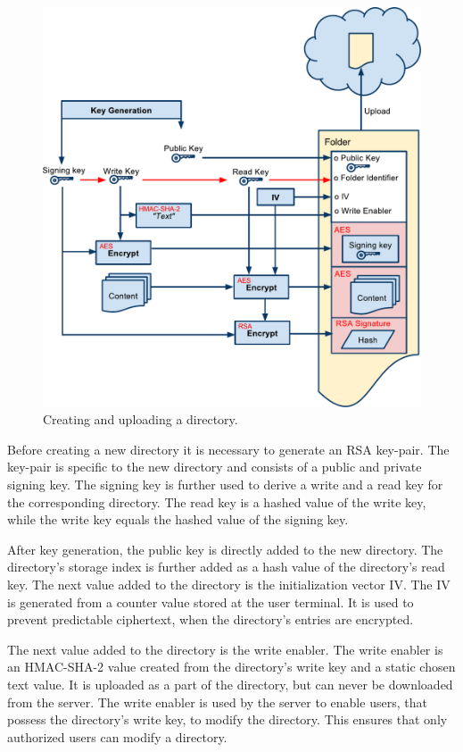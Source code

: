 \documentclass[pdftex,english,10pt,b5paper,twoside]{book}
\begin{document}
\begin{figure}[h!]
    \centering
        \includegraphics[width=\columnwidth]{CryptoCreateFolder.pdf}
	    \caption{Creating and uploading a directory.}
    \label{fig:CS:CD}
\end{figure}

Before creating a new directory it is necessary to generate an RSA key-pair. The
key-pair is specific to the new directory and consists of a public and private
signing key. The signing key is further used to derive a write and a read key
for the corresponding directory. The read key is a hashed value of the write
key, while the write key equals the hashed value of the signing  key. 

After key generation, the public key is directly added to the new directory. The
directory's storage index is further added as a hash value of the directory's
read key. The next value added to the directory is the initialization vector
\ac{IV}. The IV is generated from a counter value stored at the user terminal. It
is used to prevent predictable ciphertext, when the directory's entries are encrypted.

The next value added to the directory is the write enabler. The write enabler is
an HMAC-SHA-2 value created from the directory's write key and a static chosen
text value. It is uploaded as a part of the directory, but can never be
downloaded from the server. The write enabler is used by the server to enable
users, that possess the directory's write key, to modify the directory. This
ensures that only authorized users can modify a directory.
\end{document}
